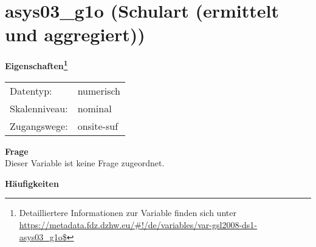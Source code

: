 
    \setcounter{footnote}{0}

    \vspace*{-1.8cm}
	\section{asys03\_g1o (Schulart (ermittelt und aggregiert))}
	\label{section:asys03_g1o}



    \vspace*{0.5cm}
    \noindent\textbf{Eigenschaften\footnote{Detailliertere Informationen zur Variable finden sich unter
		\url{https://metadata.fdz.dzhw.eu/\#!/de/variables/var-gsl2008-ds1-asys03_g1o$}}}\\
	\begin{tabularx}{\hsize}{@{}lX}
	Datentyp: & numerisch \\
	Skalenniveau: & nominal \\
	Zugangswege: &
	  onsite-suf
 \\
    \end{tabularx}



		\vspace*{0.5cm}
		\noindent\textbf{Frage}\\
		Dieser Variable ist keine Frage zugeordnet.





        		\vspace*{0.5cm}
                \noindent\textbf{Häufigkeiten}

